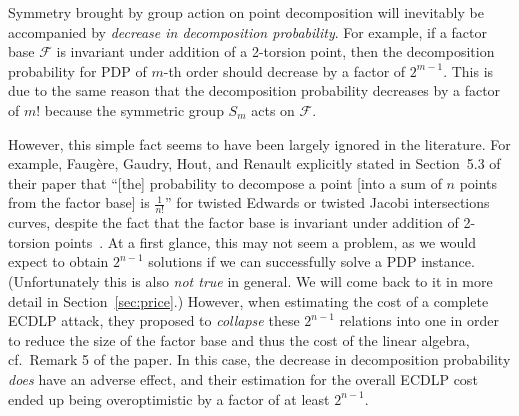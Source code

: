 Symmetry brought by group action on point decomposition will
inevitably be accompanied by \emph{decrease in decomposition
  probability}.
%
For example, if a factor base $\mathcal F$ is invariant under addition
of a 2-torsion point, then the decomposition probability for PDP of
$m$-th order should decrease by a factor of $2^{m-1}$.
%
This is due to the same reason that the decomposition probability
decreases by a factor of $m!$ because the symmetric group $S_m$ acts
on $\mathcal F$.

However, this simple fact seems to have been largely ignored in the
literature.
%
For example, Faug\`ere, Gaudry, Hout, and Renault explicitly stated in
Section~5.3 of their paper that ``[the] probability to decompose a
point [into a sum of $n$ points from the factor base] is
$\frac{1}{n!}$'' for twisted Edwards or twisted Jacobi intersections
curves, despite the fact that the factor base is invariant under
addition of 2-torsion points~\cite{DBLP:journals/joc/FaugereGHR14}.
%
At a first glance, this may not seem a problem, as we would expect to
obtain $2^{n-1}$ solutions if we can successfully solve a PDP
instance.
%
(Unfortunately this is also \emph{not true} in general.  We will come
back to it in more detail in Section~\ref{sec:price}.)
% 
However, when estimating the cost of a complete ECDLP attack, they
proposed to \emph{collapse} these $2^{n-1}$ relations into one in
order to reduce the size of the factor base and thus the cost of the
linear algebra, cf.~Remark 5 of the paper.
%
In this case, the decrease in decomposition probability \emph{does}
have an adverse effect, and their estimation for the overall ECDLP
cost ended up being overoptimistic by a factor of at least $2^{n-1}$.

